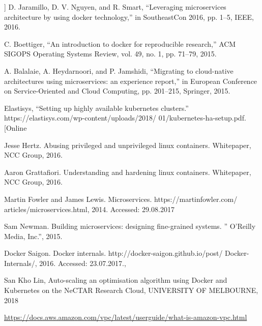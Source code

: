 \documentclass[thesis=M,czech]{FITthesis}[2019/12/23]
\theoremstyle{plain}
\theoremstyle{definition}
\begin{document}
\begin{thebibliography}{9}
] D. Jaramillo, D. V. Nguyen, and R. Smart, “Leveraging microservices architecture by using docker technology,” in SoutheastCon 2016, pp. 1–5, IEEE,
2016.


C. Boettiger, “An introduction to docker for reproducible research,” ACM
SIGOPS Operating Systems Review, vol. 49, no. 1, pp. 71–79, 2015.


	A. Balalaie, A. Heydarnoori, and P. Jamshidi, “Migrating to cloud-native
architectures using microservices: an experience report,” in European Conference on Service-Oriented and Cloud Computing, pp. 201–215, Springer,
2015.



Elastisys, “Setting up highly available kubernetes clusters.”
https://elastisys.com/wp-content/uploads/2018/
01/kubernetes-ha-setup.pdf. [Online



	Jesse Hertz. Abusing privileged and unprivileged linux containers. Whitepaper,
	NCC Group, 2016.


	Aaron Grattafiori. Understanding and hardening linux containers. Whitepaper,
NCC Group, 2016.


Martin Fowler and James Lewis. Microservices. https://martinfowler.com/
articles/microservices.html, 2014. Accessed: 29.08.2017


Sam Newman. Building microservices: designing fine-grained systems. ” O’Reilly
Media, Inc.”, 2015.


Docker Saigon. Docker internals. http://docker-saigon.github.io/post/
Docker-Internals/, 2016. Accessed: 23.07.2017., 



San Kho Lin, Auto-scaling an optimisation algorithm using Docker and Kubernetes on the NeCTAR Research Cloud, UNIVERSITY OF MELBOURNE, 2018




\url{https://docs.aws.amazon.com/vpc/latest/userguide/what-is-amazon-vpc.html
}



\end{thebibliography}
\end{document}
